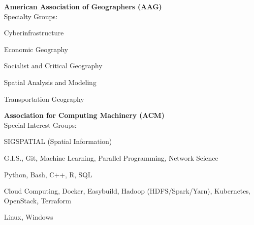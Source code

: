 \documentclass{acmcv}
\begin{document}
    \textbf{American Association of Geographers (AAG)} \\
    Specialty Groups: \\ \vspace{-.3cm}
    \begin{multicols}{2}
    \begin{titemize}
        \item Cyberinfrastructure
        \item Economic Geography
        \item Socialist and Critical Geography
        \item Spatial Analysis and Modeling
        \item Transportation Geography
    \end{titemize}
    \end{multicols}

    \textbf{Association for Computing Machinery (ACM)} \\
    Special Interest Groups: \\ \vspace{.25cm}
    \begin{titemize}
        \item SIGSPATIAL (Spatial Information)
    \end{titemize}

    

	
	
	

	
	\begin{description}[topsep=0pt,itemsep=1pt]
		 G.I.S., Git, Machine Learning, Parallel Programming, Network Science
		
		 Python, Bash, C++, R, SQL
		
		 Cloud Computing, Docker, Easybuild, Hadoop (HDFS/Spark/Yarn), Kubernetes, OpenStack, Terraform
		
		 Linux, Windows
	\end{description}
\end{document}
